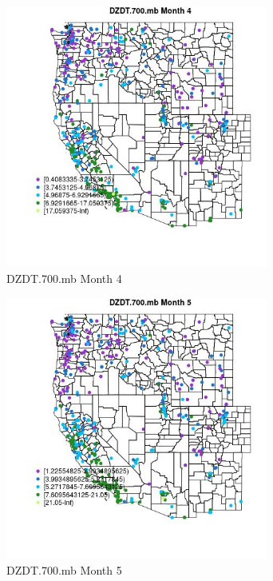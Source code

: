 \begin{figure} 
\centering  
\includegraphics[width=0.77\textwidth]{Code_Outputs/ML_input_report_ML_input_PM25_Step5_part_d_de_duplicated_aves_ML_input_MapObsMo4DZDT700mb.jpg} 
\caption{\label{fig:ML_input_report_ML_input_PM25_Step5_part_d_de_duplicated_aves_ML_inputMapObsMo4DZDT700mb}DZDT.700.mb Month 4} 
\end{figure} 
 

\begin{figure} 
\centering  
\includegraphics[width=0.77\textwidth]{Code_Outputs/ML_input_report_ML_input_PM25_Step5_part_d_de_duplicated_aves_ML_input_MapObsMo5DZDT700mb.jpg} 
\caption{\label{fig:ML_input_report_ML_input_PM25_Step5_part_d_de_duplicated_aves_ML_inputMapObsMo5DZDT700mb}DZDT.700.mb Month 5} 
\end{figure} 
 

